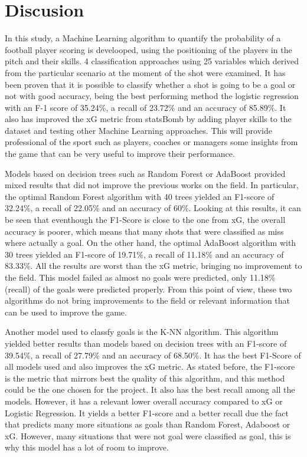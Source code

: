 \documentclass[]{article}
\begin{document}
\hypertarget{discusion}{%
\section{Discusion}\label{discusion}}

In this study, a Machine Learning algorithm to quantify the probability
of a football player scoring is develooped, using the positioning of the
players in the pitch and their skills. 4 classification approaches using
25 variables which derived from the particular scenario at the moment of
the shot were examined. It has been proven that it is possible to
classify whether a shot is going to be a goal or not with good accuracy,
being the best performing method the logistic regression with an F-1
score of 35.24\%, a recall of 23.72\% and an accuracy of 85.89\%. It
also has improved the xG metric from statsBomb by adding player skills
to the dataset and testing other Machine Learning approaches. This will
provide professional of the sport such as players, coaches or managers
some insights from the game that can be very useful to improve their
performance.

Models based on decision trees such as Random Forest or AdaBoost
provided mixed results that did not improve the previous works on the
field. In particular, the optimal Random Forest algorithm with 40 trees
yielded an F1-score of 32.24\%, a recall of 22.05\% and an accuracy of
60\%. Looking at this results, it can be seen that eventhough the
F1-Score is close to the one from xG, the overall accuracy is poorer,
which means that many shots that were classified as miss where actually
a goal. On the other hand, the optimal AdaBoost algorithm with 30 trees
yielded an F1-score of 19.71\%, a recall of 11.18\% and an accuracy of
83.33\%. All the results are worst than the xG metric, bringing no
improvement to the field. This model failed as almost no goals were
predicted, only 11.18\% (recall) of the goals were predicted properly.
From this point of view, these two algorithms do not bring improvements
to the field or relevant information that can be used to improve the
game.

Another model used to classfy goals is the K-NN algorithm. This
algorithm yielded better results than models based on decision trees
with an F1-score of 39.54\%, a recall of 27.79\% and an accuracy of
68.50\%. It has the best F1-Score of all models used and also improves
the xG metric. As stated before, the F1-score is the metric that mirrors
best the quality of this algorithm, and this method could be the one
chosen for the project. It also has the best recall among all the
models. However, it has a relevant lower overall accuracy compared to xG
or Logistic Regression. It yields a better F1-score and a better recall
due the fact that predicts many more situations as goals than Random
Forest, Adaboost or xG. However, many situations that were not goal were
classified as goal, this is why this model has a lot of room to improve.
\end{document}
